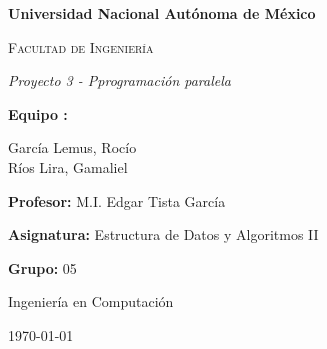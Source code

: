 \begin{titlepage}
  \centering
  {\bfseries\huge Universidad Nacional Autónoma de México \par}
  \vspace{1cm}
  {\scshape\LARGE Facultad de Ingeniería \par}
  \vfill
  {\itshape\Huge Proyecto 3 - Pprogramación paralela\par}
  \vfill
  {\LARGE \textbf{Equipo :}\par}
  \vspace{0.5cm}
  {\large García Lemus, Rocío\\Ríos Lira, Gamaliel\par}
  \vfill
  {\Large \textbf{Profesor:} M.I. Edgar Tista García \par}
  {\Large \textbf{Asignatura:} Estructura de Datos y Algoritmos II \par}
  {\Large \textbf{Grupo:} 05 \par}
  \vfill
  {\large Ingeniería en Computación \par}
  {\large \today \par}
\end{titlepage}
